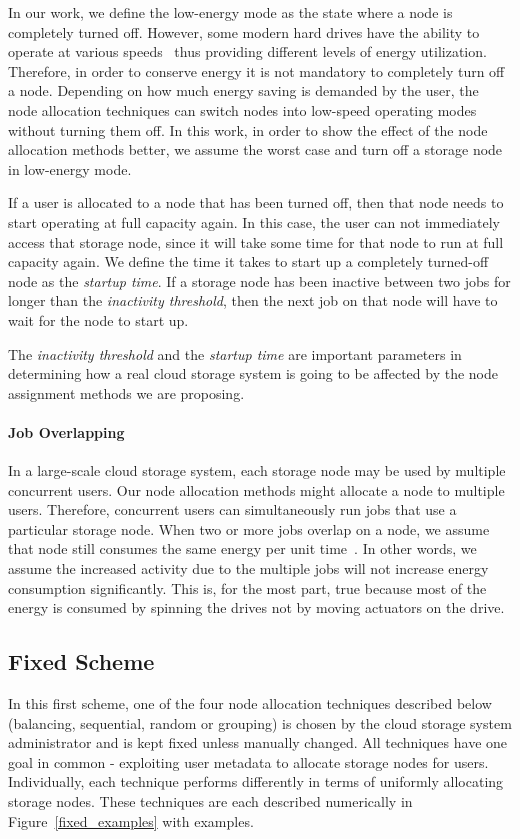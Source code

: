 In our work, we define the low-energy mode as the state where a node is completely turned off. However,
some modern hard drives have the ability to operate at various
speeds~\cite{Gurumurthi:2003:DDS:871656.859638} thus providing
different levels of energy utilization.
Therefore, in order to conserve energy it is not mandatory to completely turn off a node. Depending on how
much energy saving is demanded by the user, the node allocation techniques can switch nodes into
low-speed operating modes without turning them off. In this work, in order to show the effect of the
node allocation methods better, we assume the worst case and turn off a storage node in low-energy
mode.

If a user is allocated to a node that has been turned off, then that
node needs to start operating at full capacity again. In this case, the user can not immediately access
that storage node, since it will take some time for that node to run at full capacity again. We define the time
it takes to start up a completely turned-off node as the \textit{startup time}. If a storage node has been inactive
between two jobs for longer than the \textit{inactivity threshold}, then the next job on that node
will have to wait for the node to start up.

The \textit{inactivity threshold} and the \textit{startup time} are
important parameters in determining how a real cloud storage
system is going to be affected by the node assignment methods we are proposing.

\paragraph{Job Overlapping}
In a large-scale cloud storage system, each storage node may be used by multiple concurrent users. Our node allocation
methods might allocate a node to multiple users. Therefore, concurrent users can simultaneously
run jobs that use a particular storage node. When two or more jobs overlap on a node, we assume that
node still consumes the same energy per unit
time~\cite{Tsirogiannis:2010:AEE:1807167.1807194}. In other words,
we assume the increased activity due to the multiple jobs will not
increase energy consumption significantly. This is, for the most
part, true because most of the energy is consumed by spinning the
drives not by moving actuators on the drive.

\subsection{Fixed Scheme}
\label{fixed}
In this first scheme, one of the four node allocation techniques described below 
(balancing, sequential, random or grouping) is chosen by the cloud
storage system administrator
and is kept fixed unless manually changed. All techniques have one goal
in common - exploiting user metadata to allocate storage nodes for users. Individually,
each technique performs differently in terms of uniformly allocating storage nodes.
These techniques are each described numerically in Figure~\ref{fixed_examples} with examples.


